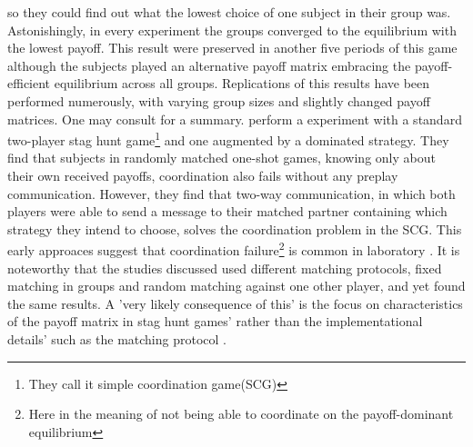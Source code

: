 \documentclass[11pt]{article}
\begin{document}
so they could find out what the lowest choice of one subject in their group was.
Astonishingly, in every experiment the groups converged
to the equilibrium with the lowest payoff. This result were preserved in another 
five periods of this game although the subjects played an alternative payoff
matrix embracing the payoff-efficient equilibrium across all groups. 
Replications of this results have been performed numerously, with varying group
sizes and slightly changed payoff matrices. One may consult \textcite{devetag_when_2007}
for a summary. 
\textcite{cooper_communication_1992} perform a experiment with a standard two-player stag
hunt game\footnote{They call it simple coordination game(SCG)} 
and one augmented by a dominated strategy. They find that 
subjects in randomly matched one-shot games, knowing only about their own
received payoffs, coordination also fails without any preplay communication. 
However, they find that two-way communication, in which both players were
able to send a message to their matched partner containing which strategy
they intend to choose, solves the coordination problem in the SCG. 
This early approaces suggest that coordination failure\footnote{Here in the 
meaning of not being able to coordinate on the payoff-dominant equilibrium} is
common in laboratory \parencite{devetag_when_2007}. It is noteworthy that the studies 
discussed used different matching protocols, fixed matching in groups and 
random matching against one other player, and yet found the same results. 
A 'very likely consequence of this' is the focus on characteristics of the
payoff matrix in stag hunt games' rather than the implementational details' 
such as the matching protocol \parencite{devetag_when_2007}.
\end{document}
